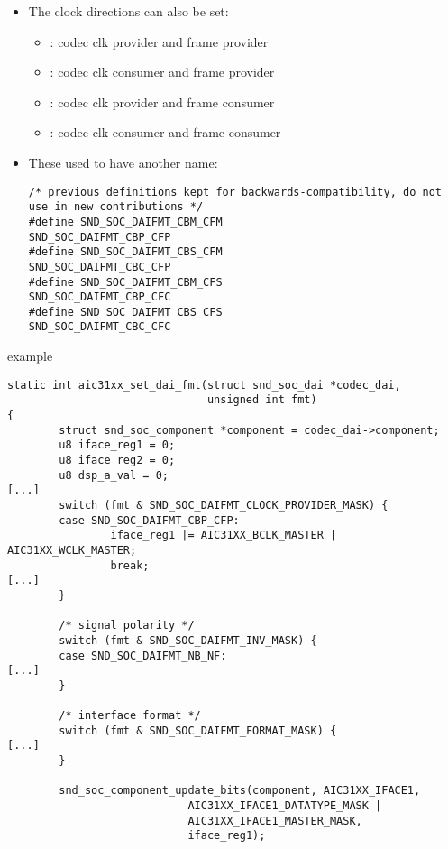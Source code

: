 \begin{frame}[fragile]{}
  \begin{itemize}
  \item The clock directions can also be set:
    \begin{itemize}
    \item {}: codec clk provider and frame provider
    \item {}: codec clk consumer and frame provider
    \item {}: codec clk provider and frame consumer
    \item {}: codec clk consumer and frame consumer
    \end{itemize}
  \item These used to have another name:
  \begin{block}{}
    \fontsize{9}{9}\selectfont
    \begin{verbatim}
/* previous definitions kept for backwards-compatibility, do not use in new contributions */
#define SND_SOC_DAIFMT_CBM_CFM                SND_SOC_DAIFMT_CBP_CFP
#define SND_SOC_DAIFMT_CBS_CFM                SND_SOC_DAIFMT_CBC_CFP
#define SND_SOC_DAIFMT_CBM_CFS                SND_SOC_DAIFMT_CBP_CFC
#define SND_SOC_DAIFMT_CBS_CFS                SND_SOC_DAIFMT_CBC_CFC
    \end{verbatim}
  \end{block}
  \end{itemize}
\end{frame}

\begin{frame}[fragile]{ example}
  \begin{block}{}
    \fontsize{7}{7}\selectfont
    \begin{verbatim}
static int aic31xx_set_dai_fmt(struct snd_soc_dai *codec_dai,
                               unsigned int fmt)
{
        struct snd_soc_component *component = codec_dai->component;
        u8 iface_reg1 = 0;
        u8 iface_reg2 = 0;
        u8 dsp_a_val = 0;
[...]
        switch (fmt & SND_SOC_DAIFMT_CLOCK_PROVIDER_MASK) {
        case SND_SOC_DAIFMT_CBP_CFP:
                iface_reg1 |= AIC31XX_BCLK_MASTER | AIC31XX_WCLK_MASTER;
                break;
[...]
        }

        /* signal polarity */
        switch (fmt & SND_SOC_DAIFMT_INV_MASK) {
        case SND_SOC_DAIFMT_NB_NF:
[...]
        }

        /* interface format */
        switch (fmt & SND_SOC_DAIFMT_FORMAT_MASK) {
[...]
        }

        snd_soc_component_update_bits(component, AIC31XX_IFACE1,
                            AIC31XX_IFACE1_DATATYPE_MASK |
                            AIC31XX_IFACE1_MASTER_MASK,
                            iface_reg1);
    \end{verbatim}
  \end{block}
\end{frame}

